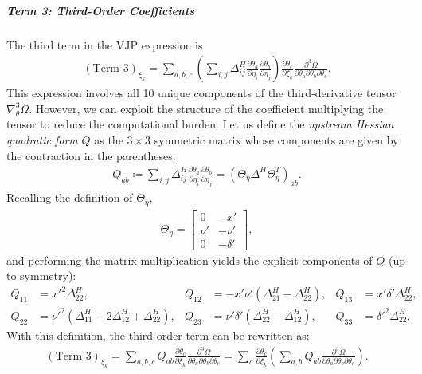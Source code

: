 \documentclass{article}
\begin{document}
\subparagraph{Term 3: Third-Order Coefficients}

The third term in the VJP expression is
%
\begin{align}
  (\text{Term 3})_{\xi_k} = \sum_{a,b,c} \left( \sum_{i,j} \Delta^H_{ij} \frac{\partial \theta_a}{\partial \eta_i} \frac{\partial \theta_b}{\partial \eta_j} \right) \frac{\partial \theta_c}{\partial \xi_k} \frac{\partial^3 \Omega}{\partial \theta_a \partial \theta_b \partial \theta_c}.
\end{align}
%
This expression involves all 10 unique components of the third-derivative tensor $\nabla_\theta^3 \Omega$.
However, we can exploit the structure of the coefficient multiplying the tensor to reduce the computational burden.
Let us define the \textit{upstream Hessian quadratic form} $Q$ as the $3 \times 3$ symmetric matrix whose components are given by the contraction in the parentheses:
%
\begin{align}
  Q_{ab} \coloneqq \sum_{i,j} \Delta^H_{ij} \frac{\partial \theta_a}{\partial \eta_i} \frac{\partial \theta_b}{\partial \eta_j} = (\Theta_\eta \Delta^H \Theta_\eta^T)_{ab}.
\end{align}
%
Recalling the definition of $\Theta_\eta$,
\begin{align}
  \Theta_{\eta} =
  \begin{bmatrix}
    0    & -x'      \\
    \nu' & -\nu'    \\
    0    & -\delta'
  \end{bmatrix},
\end{align}
%
and performing the matrix multiplication yields the explicit components of $Q$ (up to symmetry):
%
\begin{align}
  Q_{11} & = x'^2 \Delta^H_{22},                                      & Q_{12} & = -x' \nu' (\Delta^H_{21} - \Delta^H_{22}),     & Q_{13} & = x' \delta' \Delta^H_{22}, \\
  Q_{22} & = \nu'^2 (\Delta^H_{11} - 2\Delta^H_{12} + \Delta^H_{22}), & Q_{23} & = \nu' \delta' (\Delta^H_{22} - \Delta^H_{12}), & Q_{33} & = \delta'^2 \Delta^H_{22}.
\end{align}
%
With this definition, the third-order term can be rewritten as:
%
\begin{align}
  (\text{Term 3})_{\xi_k} = \sum_{a,b,c} Q_{ab} \frac{\partial \theta_c}{\partial \xi_k} \frac{\partial^3 \Omega}{\partial \theta_a \partial \theta_b \partial \theta_c} = \sum_c \frac{\partial \theta_c}{\partial \xi_k} \left( \sum_{a,b} Q_{ab} \frac{\partial^3 \Omega}{\partial \theta_a \partial \theta_b \partial \theta_c} \right).
\end{align}
\end{document}
